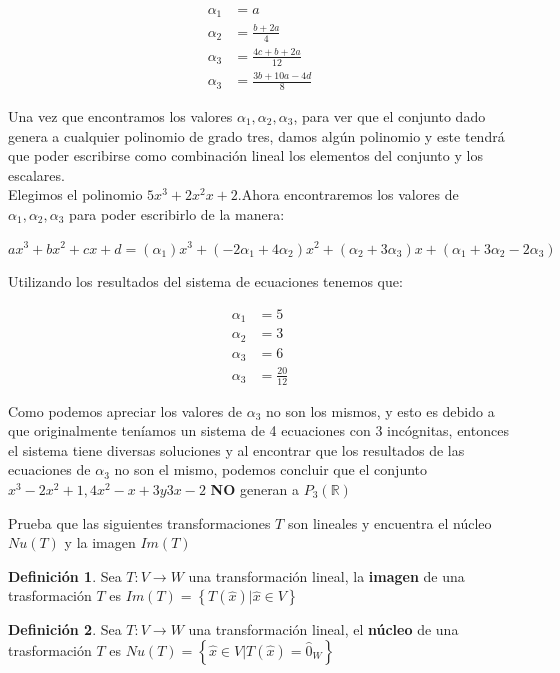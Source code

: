 \documentclass[letterpaper]{article}
\newcommand{\R}{\mathds{R}}
\renewcommand{\*}{\cdot}
\theoremstyle{definition}
\newtheorem{definition}{Definición}
\begin{document}
	\begin{center}
		\begin{align*}
		\alpha_{1}&=a\\
		\alpha_{2}&=\frac{b+2a}{4}\\
		\alpha_{3}&=\frac{4c+b+2a}{12}\\
		\alpha_{3}&=\frac{3b+10a-4d}{8}
		\end{align*}
	\end{center}

Una vez que encontramos los valores $\alpha_{1}, \alpha_{2}, \alpha_{3}$, para ver que el conjunto dado genera a cualquier polinomio de grado tres, damos algún polinomio y este tendrá que poder escribirse como combinación lineal los elementos del conjunto y los escalares.\\

Elegimos el polinomio $5x^3+2x^2x+2$.Ahora encontraremos los valores de $\alpha_{1}, \alpha_{2}, \alpha_{3}$ para poder escribirlo de la manera:
\begin{center}
	$ax^3+bx^2+cx+d = (\alpha_{1})x^3 + (-2\alpha_{1}+4\alpha_{2})x^2 + (\alpha_{2}+3\alpha_{3})x + (\alpha_{1}+3\alpha_{2}-2\alpha_{3})$
\end{center} 
Utilizando los resultados del sistema de ecuaciones tenemos que:

		\begin{align*}
		\alpha_{1}&=5\\
		\alpha_{2}&=3\\
		\alpha_{3}&=6\\
		\alpha_{3}&=\frac{20}{12}
		\end{align*}
		
Como podemos apreciar los valores de $\alpha_{3}$ no son los mismos, y esto es debido a que originalmente teníamos un sistema de 4 ecuaciones con 3 incógnitas, entonces el sistema tiene diversas soluciones y al encontrar que los resultados de las ecuaciones de $\alpha_{3}$ no son el mismo, podemos concluir que el conjunto $x^3-2x^2+1,4x^2-x+3 y 3x-2$  \textbf{NO} generan a $P_{3}(\R)$\\

\begin{ejercicio}{10}
	Prueba que las siguientes transformaciones $T$ son lineales y encuentra el núcleo $Nu(T)$ y la imagen $Im(T)$
\end{ejercicio}
\begin{definition}
	Sea $ T: V \rightarrow W $ una transformación lineal, la \textbf{imagen} de una trasformación $ T $ es $Im(T) = \left\lbrace T(\hat{x}) | \hat{x} \in V  \right\rbrace$
\end{definition}
\begin{definition}
	Sea $ T: V \rightarrow W $ una transformación lineal, el \textbf{núcleo} de una trasformación $ T $ es $Nu(T) = \left\lbrace \hat{x} \in V | T(\hat{x}) = \hat{0}_{W}  \right\rbrace$
\end{definition}
\end{document}
